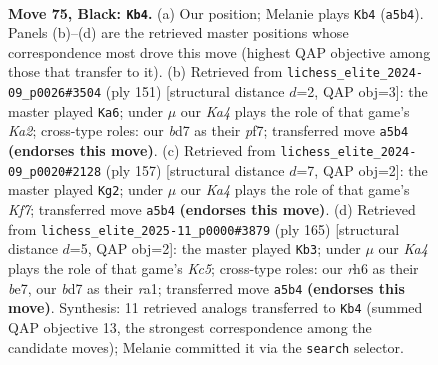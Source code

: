 \documentclass[11pt]{article}
\begin{document}
\clearpage

\begin{figure}[p]\centering
\begin{subfigure}{0.46\textwidth}\centering
\resizebox{\linewidth}{!}{%
\newchessgame
\chessboard[
  setfen={8/3B1P2/7R/k7/8/8/5K1P/8 b - - 4 75},
  showmover=false,
  pgfstyle=straightmove, color=movearrow, markmove={a5-b4}
]}
\caption{}
\end{subfigure}\hfill
\begin{subfigure}{0.46\textwidth}\centering
\resizebox{\linewidth}{!}{%
\newchessgame
\chessboard[
  setfen={7R/k4P2/2K5/8/7P/8/8/8 b - - 0 76},
  showmover=false,
  pgfstyle=straightmove, color=movearrow, markmove={a7-a6}
]}
\caption{}
\end{subfigure}
\\[4pt]
\begin{subfigure}{0.46\textwidth}\centering
\resizebox{\linewidth}{!}{%
\newchessgame
\chessboard[
  setfen={8/1P2R3/8/8/5K2/8/5k2/8 b - - 0 79},
  showmover=false,
  pgfstyle=straightmove, color=movearrow, markmove={f2-g2}
]}
\caption{}
\end{subfigure}\hfill
\begin{subfigure}{0.46\textwidth}\centering
\resizebox{\linewidth}{!}{%
\newchessgame
\chessboard[
  setfen={8/4B3/7P/8/2k4P/8/5K2/R7 b - - 2 83},
  showmover=false,
  pgfstyle=straightmove, color=movearrow, markmove={c4-b3}
]}
\caption{}
\end{subfigure}
\caption{\textbf{Move 75, Black: \texttt{Kb4}.} (a) Our position; Melanie plays \texttt{Kb4} (\texttt{a5b4}). Panels (b)--(d) are the retrieved master positions whose correspondence most drove this move (highest QAP objective among those that transfer to it). (b) Retrieved from \texttt{lichess\_elite\_2024-09\_p0026\#3504} (ply 151) [structural distance $d$=2, QAP obj=3]: the master played \texttt{Ka6}; under $\mu$ our \emph{Ka4} plays the role of that game's \emph{Ka2}; cross-type roles: our \emph{b}d7 as their \emph{p}f7; transferred move \texttt{a5b4} \textbf{(endorses this move)}. (c) Retrieved from \texttt{lichess\_elite\_2024-09\_p0020\#2128} (ply 157) [structural distance $d$=7, QAP obj=2]: the master played \texttt{Kg2}; under $\mu$ our \emph{Ka4} plays the role of that game's \emph{Kf7}; transferred move \texttt{a5b4} \textbf{(endorses this move)}. (d) Retrieved from \texttt{lichess\_elite\_2025-11\_p0000\#3879} (ply 165) [structural distance $d$=5, QAP obj=2]: the master played \texttt{Kb3}; under $\mu$ our \emph{Ka4} plays the role of that game's \emph{Kc5}; cross-type roles: our \emph{r}h6 as their \emph{b}e7, our \emph{b}d7 as their \emph{r}a1; transferred move \texttt{a5b4} \textbf{(endorses this move)}. Synthesis: 11 retrieved analogs transferred to \texttt{Kb4} (summed QAP objective 13, the strongest correspondence among the candidate moves); Melanie committed it via the \texttt{search} selector.}
\label{fig:thought-m149}
\end{figure}
\end{document}
